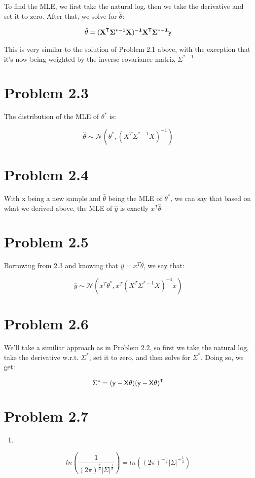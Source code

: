 \documentclass{article}
\begin{document}
To find the MLE, we first take the natural log, then we take the derivative and set it to zero. After that, we solve for $\hat{\theta}$:

\begin{align*}
  \hat{\theta} = (\bf{X}^{\sf{T}}\Sigma^{*-1}\bf{X})^{-1}\bf{X}^{\sf{T}}\Sigma^{*-1}\bf{\sf{y}}
\end{align*}

This is very similar to the solution of Problem 2.1 above, with the exception that it's now being weighted by the inverse covariance matrix $\Sigma^{*-1}$

\section*{Problem 2.3}

The distribution of the MLE of $\theta^*$ is:

\[\hat{\theta} \sim \mathcal{N}(\theta^*, (X^T\Sigma^{*-1}X)^{-1})\]

\section*{Problem 2.4}

With x being a new sample and $\hat{\theta}$ being the MLE of $\theta^*$, we can say that based on what we derived above, the MLE of $\hat{y}$ is exactly $x^T\hat{\theta}$

\section*{Problem 2.5}

Borrowing from 2.3 and knowing that $\hat{y} = x^T\hat{\theta}$, we say that:

\[\hat{y} \sim \mathcal{N}(x^T\theta^*, x^T (X^T\Sigma^{*-1}X)^{-1}x)\]

\section*{Problem 2.6}

We'll take a similiar approach as in Problem 2.2, so first we take the natural log, take the derivative w.r.t. $\Sigma^*$, set it to zero, and then solve for $\Sigma^*$. Doing so, we get:

\[\Sigma^* = (\sf{y}-X\theta)(\sf{y}-X\theta)^T\]

\section*{Problem 2.7}
\begin{enumerate}[label=(\alph*)]
  \item 
\end{enumerate}


\[ln(\frac{1}{(2\pi)^{\frac{n}{2}}|\Sigma|^{\frac{1}{2}}}) = ln((2\pi)^{-\frac{n}{2}}|\Sigma|^{-\frac{1}{2}})\]
\end{document}
